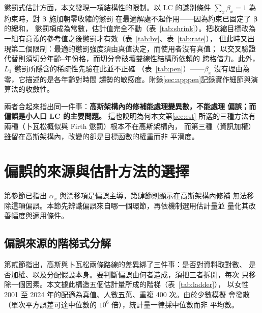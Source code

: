 \documentclass[UTF8, fontset=macnew, a4paper, 12pt]{ctexart}
\begin{document}
懲罰式估計方面，本文發現一項結構性的限制。以 LC 的識別條件
$\sum_x\beta_x=1$ 為約束時，對 $\boldsymbol{\beta}$ 施加朝零收縮的懲罰
在最適解處不起作用——因為約束已固定了 $\boldsymbol{\beta}$ 的總和，
懲罰項成為常數，估計值完全不動（表~\ref{tab:shrink}）。把收縮目標改為
一組有意義的參考值之後懲罰才有效（表~\ref{tab:bv}、表~\ref{tab:rate}），
但此時又出現第二個限制：最適的懲罰強度須由真值決定，而使用者沒有真值；
以交叉驗證代替則須切分年齡--年份格，而切分會破壞雙線性結構所依賴的
跨格借力。此外，$L_1$ 懲罰所隱含的稀疏性先驗在此並不正確
（表~\ref{tab:pen}）——$\beta_x$ 沒有理由為零，它描述的是各年齡對時間
趨勢的敏感度。附錄\ref{sec:apppen}記錄實作細節與演算法的收斂性。

兩者合起來指出同一件事：\textbf{高斯架構內的修補能處理變異數，不能處理
偏誤；而偏誤是小人口 LC 的主要問題。} 這也說明為何本文第\ref{sec:est}
所選的三種方法有兩種（卜瓦松概似與 Firth 懲罰）根本不在高斯架構內，
而第三種（資訊加權）雖留在高斯架構內，改變的卻是目標函數的權重而非
平滑度。

\section{偏誤的來源與估計方法的選擇}

第參節已指出 $\alpha_x$ 與漂移項是偏誤主導，第肆節則顯示在高斯架構內修補
無法移除這項偏誤。本節先辨識偏誤來自哪一個環節，再依機制選用估計量並
量化其改善幅度與適用條件。

\subsection{偏誤來源的階梯式分解}\label{sec:decomp}

第貳節指出，高斯與卜瓦松兩條路線的差異綁了三件事：是否對資料取對數、
是否加權、以及分配假設本身。要判斷偏誤由何者造成，須把三者拆開，每次
只移除一個因素。本文據此構造五個估計量所成的階梯（表~\ref{tab:ladder}），
以女性 2001 至 2024 年的配適為真值、人數五萬、重複 400 次。由於少數模擬
會發散（單次平方誤差可達中位數的 $10^6$ 倍），統計量一律採中位數而非
平均數。
\end{document}
